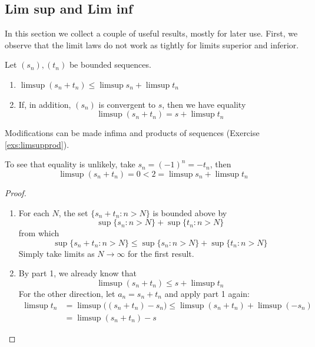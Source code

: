 \clearpage


\subsection{Lim sup and Lim inf}

In this section we collect a couple of useful results, mostly for later use. First, we observe that the limit laws do not work as tightly for limits superior and inferior.

\begin{thm}{}{}
	Let $(s_n),(t_n)$ be bounded sequences.
	\begin{enumerate}
	  \item $\limsup(s_n+t_n)\le\limsup s_n+\limsup t_n$
	  \item If, in addition, $(s_n)$ is convergent to $s$, then we have equality
	\[\limsup(s_n+t_n)=s+\limsup t_n\]
	\end{enumerate}
\end{thm}

Modifications can be made infima and products of sequences (Exercise \ref{exs:limsupprod}).

\begin{example}{}{}
	To see that equality is unlikely, take $s_n=(-1)^n=-t_n$, then
	\[\limsup(s_n+t_n)=0<2=\limsup s_n+\limsup t_n\]
\end{example}

\begin{proof}
\begin{enumerate}
  \item For each $N$, the set $\{s_n+t_n:n>N\}$ is bounded above by
	\[\sup\{s_n:n>N\}+\sup\{t_n:n>N\}\]
	from which
	\[\sup\{s_n+t_n:n>N\}\le\sup\{s_n:n>N\}+\sup\{t_n:n>N\}\]
	Simply take limits as $N\to\infty$ for the first result.\smallbreak
	
% 	
	
	\item By part 1, we already know that
	\[\limsup(s_n+t_n)\le s+\limsup t_n\]
	For the other direction, let $a_n=s_n+t_n$ and apply part 1 again:
	\begin{align*}
	\limsup t_n&=\limsup \bigl((s_n+t_n)-s_n\bigr)\le \limsup (s_n+t_n)+\limsup(-s_n)\\
	&=\limsup(s_n+t_n)-s\tag*{\qedhere}
	\end{align*}
\end{enumerate}
\end{proof}


